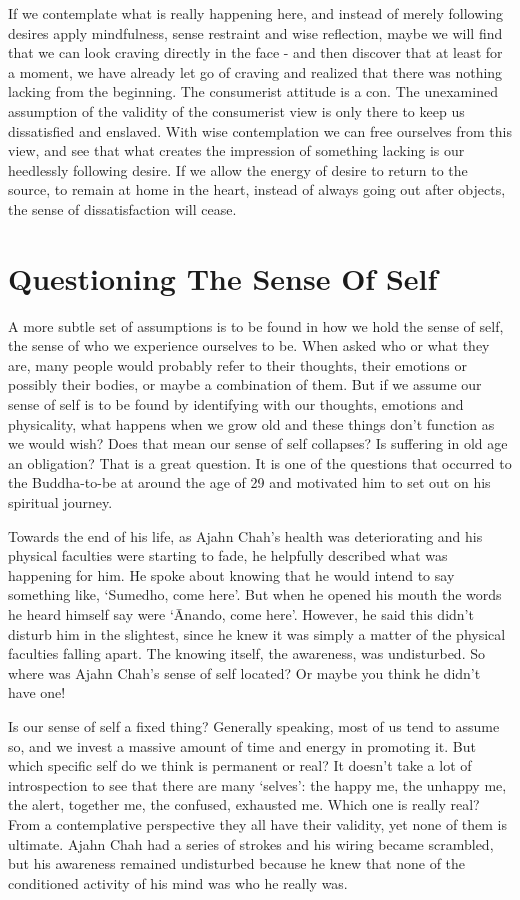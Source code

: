 If we contemplate what is really happening here, and instead of merely
following desires apply mindfulness, sense restraint and wise
reflection, maybe we will find that we can look craving directly in the
face - and then discover that at least for a moment, we have already let
go of craving and realized that there was nothing lacking from the
beginning. The consumerist attitude is a con. The unexamined assumption
of the validity of the consumerist view is only there to keep us
dissatisfied and enslaved. With wise contemplation we can free ourselves
from this view, and see that what creates the impression of something
lacking is our heedlessly following desire. If we allow the energy of
desire to return to the source, to remain at home in the heart, instead
of always going out after objects, the sense of dissatisfaction will
cease.

\section{Questioning The Sense Of Self}

A more subtle set of assumptions is to be found in how we hold the
sense of self, the sense of who we experience ourselves to be. When
asked who or what they are, many people would probably refer to their
thoughts, their emotions or possibly their bodies, or maybe a
combination of them. But if we assume our sense of self is to be found
by identifying with our thoughts, emotions and physicality, what happens
when we grow old and these things don’t function as we would wish? Does
that mean our sense of self collapses? Is suffering in old age an
obligation? That is a great question. It is one of the questions that
occurred to the Buddha-to-be at around the age of 29 and motivated him
to set out on his spiritual journey.

Towards the end of his life, as Ajahn Chah’s health was deteriorating
and his physical faculties were starting to fade, he helpfully described
what was happening for him. He spoke about knowing that he would intend
to say something like, ‘Sumedho, come here’. But when he opened his
mouth the words he heard himself say were ‘Ānando, come here’. However,
he said this didn’t disturb him in the slightest, since he knew it was
simply a matter of the physical faculties falling apart. The knowing
itself, the awareness, was undisturbed. So where was Ajahn Chah’s sense
of self located? Or maybe you think he didn’t have one!

Is our sense of self a fixed thing? Generally speaking, most of us tend
to assume so, and we invest a massive amount of time and energy in
promoting it. But which specific self do we think is permanent or real?
It doesn’t take a lot of introspection to see that there are many
‘selves’: the happy me, the unhappy me, the alert, together me, the
confused, exhausted me. Which one is really real? From a contemplative
perspective they all have their validity, yet none of them is ultimate.
Ajahn Chah had a series of strokes and his wiring became scrambled, but
his awareness remained undisturbed because he knew that none of the
conditioned activity of his mind was who he really was.

